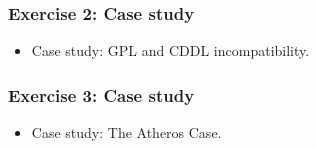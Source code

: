 \documentclass{beamer}
\begin{document}

\begin{frame}
\frametitle{Exercise 2: Case study}


\begin{itemize}
\item Case study: GPL and CDDL incompatibility. 
\end{itemize}

\end{frame}


\begin{frame}
\frametitle{Exercise 3: Case study}


\begin{itemize}
\item Case study: The Atheros Case.
\end{itemize}

\end{frame}












\end{document}

